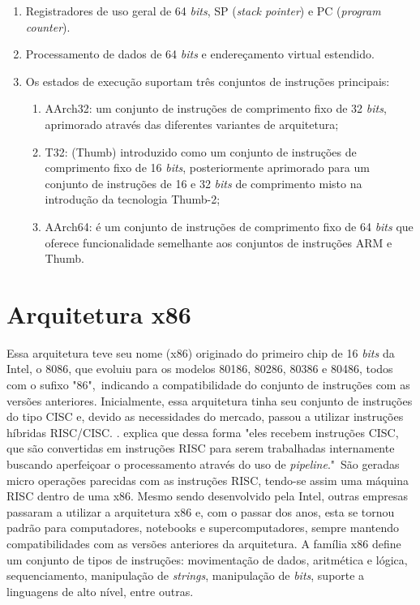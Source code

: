 \begin{enumerate}
	\item Registradores de uso geral de 64 \textit{bits}, SP (\textit{stack pointer}) e PC (\textit{program counter}).
	
	\item Processamento de dados de 64 \textit{bits} e endereçamento virtual estendido.
	
	\item Os estados de execução suportam três conjuntos de instruções principais:
	
	\begin{enumerate}
		\item AArch32: um conjunto de instruções de comprimento fixo de 32 \textit{bits}, aprimorado através das diferentes variantes de arquitetura;
		
		\item T32: (Thumb) introduzido como um conjunto de instruções de comprimento fixo de 16 \textit{bits}, posteriormente aprimorado para um conjunto de instruções de 16 e 32 \textit{bits} de comprimento misto na introdução da tecnologia Thumb-2;
		
		\item AArch64: é um conjunto de instruções de comprimento fixo de 64 \textit{bits} que oferece funcionalidade semelhante aos conjuntos de instruções ARM e Thumb.
	\end{enumerate}
	
\end{enumerate}

\section{Arquitetura x86}
\label{secao:arquitetura_x86}

Essa arquitetura teve seu nome (x86) originado do primeiro chip de 16 \textit{bits} da Intel, o 8086, que evoluiu para os modelos 80186, 80286, 80386 e 80486, todos com o sufixo "86",\ indicando a compatibilidade do conjunto de instruções com as versões anteriores. Inicialmente, essa arquitetura tinha seu conjunto de instruções do tipo CISC e, devido as necessidades do mercado, passou a utilizar instruções híbridas RISC/CISC. \cite{marmitt:2017:analise}. \citet{motyczka:2013:comparativo} explica que dessa forma "eles recebem instruções CISC, que são convertidas em instruções RISC para serem trabalhadas internamente buscando aperfeiçoar o processamento através do uso de \textit{pipeline}."\ São geradas micro operações parecidas com as instruções RISC, tendo-se assim uma máquina RISC dentro de uma x86. Mesmo sendo desenvolvido pela Intel, outras empresas passaram a utilizar a arquitetura x86 e, com o passar dos anos, esta se tornou padrão para computadores, notebooks e supercomputadores, sempre mantendo compatibilidades com as versões anteriores da arquitetura. A família x86 define um conjunto de tipos de instruções: movimentação de dados, aritmética e lógica, sequenciamento, manipulação de \textit{strings}, manipulação de \textit{bits}, suporte a linguagens de alto nível, entre outras.


